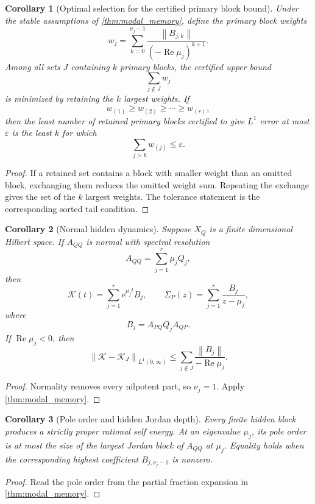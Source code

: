 \documentclass{aomart}
\newtheorem{corollary}[corollary]{Corollary}
\theoremstyle{definition}
\theoremstyle{remark}
\newcommand{\Kcal}{\mathcal K}
\newcommand{\e}{\mathrm e}
\newcommand{\norm}[1]{\left\lVert#1\right\rVert}
\begin{document}
\begin{corollary}[Optimal selection for the certified primary block bound]\label{cor:optimal_primary_selection}
Under the stable assumptions of \cref{thm:modal_memory}, define the primary block weights
\[
w_j
=
\sum_{k=0}^{\nu_j-1}
\frac{\norm{B_{j,k}}}
{(-\operatorname{Re}\mu_j)^{k+1}}.
\]
Among all sets \(J\) containing \(k\) primary blocks, the certified upper bound
\[
\sum_{j\notin J}w_j
\]
is minimized by retaining the \(k\) largest weights. If
\[
w_{(1)}\geq w_{(2)}\geq\cdots\geq w_{(r)},
\]
then the least number of retained primary blocks certified to give \(L^1\) error at most \(\varepsilon\) is the least \(k\) for which
\[
\sum_{j>k}w_{(j)}\leq\varepsilon.
\]
\end{corollary}

\begin{proof}
If a retained set contains a block with smaller weight than an omitted block, exchanging them reduces the omitted weight sum. Repeating the exchange gives the set of the \(k\) largest weights. The tolerance statement is the corresponding sorted tail condition.
\end{proof}

\begin{corollary}[Normal hidden dynamics]\label{cor:normal_modal_memory}
Suppose \(X_Q\) is a finite dimensional Hilbert space. If \(A_{QQ}\) is normal with spectral resolution
\[
A_{QQ}=\sum_{j=1}^r\mu_jQ_j,
\]
then
\[
\Kcal(t)=\sum_{j=1}^r\e^{\mu_jt}B_j,
\qquad
\Sigma_P(z)=\sum_{j=1}^r\frac{B_j}{z-\mu_j},
\]
where
\[
B_j=A_{PQ}Q_jA_{QP}.
\]
If \(\operatorname{Re}\mu_j<0\), then
\[
\norm{\Kcal-\Kcal_J}_{L^1(0,\infty)}
\leq
\sum_{j\notin J}
\frac{\norm{B_j}}{-\operatorname{Re}\mu_j}.
\]
\end{corollary}

\begin{proof}
Normality removes every nilpotent part, so \(\nu_j=1\). Apply \cref{thm:modal_memory}.
\end{proof}

\begin{corollary}[Pole order and hidden Jordan depth]\label{cor:pole_jordan_depth}
Every finite hidden block produces a strictly proper rational self energy. At an eigenvalue \(\mu_j\), its pole order is at most the size of the largest Jordan block of \(A_{QQ}\) at \(\mu_j\). Equality holds when the corresponding highest coefficient \(B_{j,\nu_j-1}\) is nonzero.
\end{corollary}

\begin{proof}
Read the pole order from the partial fraction expansion in \cref{thm:modal_memory}.
\end{proof}
\end{document}
